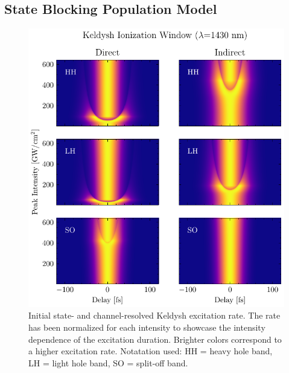 \subsection{State Blocking Population Model}
\label{sec:SB_population_model}

\begin{figure}
	\centering
	\includegraphics[width=1.0\textwidth]{figures/chap4/Keldysh_SingleInt_IonizationWindow.pdf}
	\caption{Initial state- and channel-resolved Keldysh excitation rate. The rate has been normalized for each intensity to showcase the intensity dependence of the excitation duration. Brighter colors correspond to a higher excitation rate. Notatation used: HH = heavy hole band, LH = light hole band, SO = split-off band.}
	\label{fig:Keldysh_SingleInt_IonizationWindow}
\end{figure}

